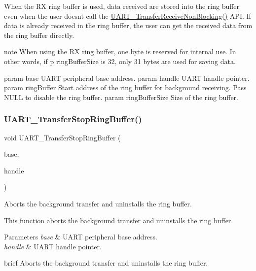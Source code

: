 When the RX ring buffer is used, data received are stored into the ring buffer even when the user doesn\textquotesingle{}t call the \mbox{\hyperlink{group__uart__driver_gaf804acde5d73ce0a5bf54b06195e1218}{U\+A\+R\+T\+\_\+\+Transfer\+Receive\+Non\+Blocking()}} A\+PI. If data is already received in the ring buffer, the user can get the received data from the ring buffer directly.

note When using the RX ring buffer, one byte is reserved for internal use. In other words, if p ring\+Buffer\+Size is 32, only 31 bytes are used for saving data.

param base U\+A\+RT peripheral base address. param handle U\+A\+RT handle pointer. param ring\+Buffer Start address of the ring buffer for background receiving. Pass N\+U\+LL to disable the ring buffer. param ring\+Buffer\+Size Size of the ring buffer. \mbox{\label{group__uart__driver_ga0c0bc73df49cb31dff0e903630314f5b}} 
\subsubsection{\texorpdfstring{UART\_TransferStopRingBuffer()}{UART\_TransferStopRingBuffer()}}
{\footnotesize\ttfamily void U\+A\+R\+T\+\_\+\+Transfer\+Stop\+Ring\+Buffer (\begin{DoxyParamCaption}\item[{\mbox{\hyperlink{struct_u_a_r_t___type}{U\+A\+R\+T\+\_\+\+Type}} $\ast$}]{base,  }\item[{\mbox{\hyperlink{struct__uart__handle}{uart\+\_\+handle\+\_\+t}} $\ast$}]{handle }\end{DoxyParamCaption})}



Aborts the background transfer and uninstalls the ring buffer. 

This function aborts the background transfer and uninstalls the ring buffer.


\begin{DoxyParams}{Parameters}
{\em base} & U\+A\+RT peripheral base address. \\
\hline
{\em handle} & U\+A\+RT handle pointer.\\
\hline
\end{DoxyParams}
brief Aborts the background transfer and uninstalls the ring buffer.

